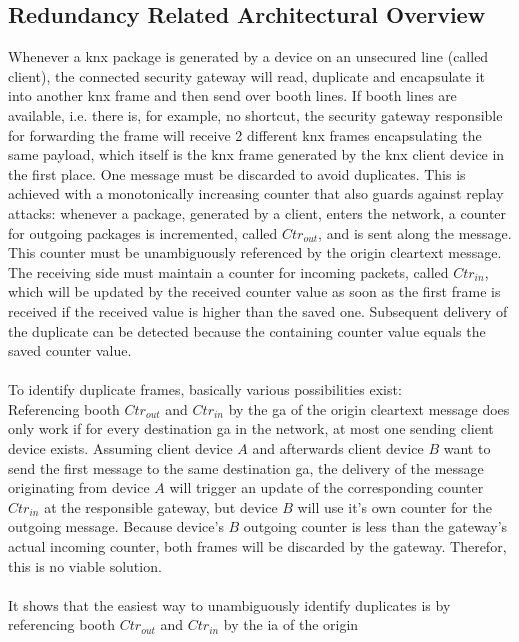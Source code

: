 \subsection{Redundancy Related Architectural Overview}\label{ctrAvail}
 
Whenever a \gls{knx} package is
generated by a device on an unsecured line (called client), the connected security gateway will read, duplicate and encapsulate it into another \gls{knx} frame 
and then send over booth lines. If booth lines are available, i.e. there is, for example, no shortcut, the security gateway responsible for forwarding the frame
will receive 2 different \gls{knx} frames encapsulating the same
payload, which itself is the \gls{knx} frame generated by the \gls{knx} client device in the first place. 
One message must be discarded to avoid duplicates. 
This is achieved with a monotonically increasing counter that also guards against replay attacks: whenever a package, generated by a client, enters the
network, a counter for outgoing packages is incremented, called $Ctr_{out}$, and is sent along the message. 
This counter must be unambiguously referenced by the origin cleartext message. 
The receiving side must maintain a counter for incoming packets, called $Ctr_{in}$, which will be updated by the received counter value
as soon as the first frame is received if the received value is higher than the saved one.
Subsequent delivery of the duplicate can be detected because the containing counter value equals the saved counter value.
\\
\\
To identify duplicate frames, basically various possibilities exist:
\\
Referencing booth $Ctr_{out}$ and $Ctr_{in}$ by the \gls{ga} of the origin cleartext message does only work if for every destination
 \gls{ga} in the network, at most one sending client device exists. Assuming client device $A$ and afterwards client device $B$ want to send the first message to
 the same destination \gls{ga}, the delivery of the message
 originating from device $A$ will trigger an update of the corresponding counter $Ctr_{in}$ at the responsible gateway, but device $B$ will use it's own counter
 for the outgoing message. Because device's $B$ outgoing counter is less than the gateway's actual incoming counter, both frames will be discarded by the gateway.
Therefor, this is no viable solution.
\\
\\
It shows that the easiest way to unambiguously identify duplicates is by referencing booth $Ctr_{out}$ and $Ctr_{in}$ by the \gls{ia} of the origin

